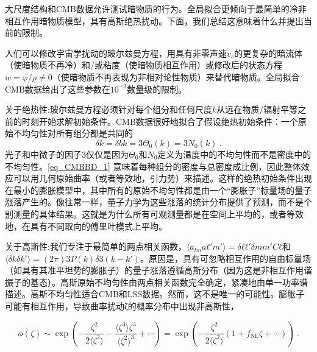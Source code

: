 
大尺度结构和CMB数据允许测试暗物质的行为。全局拟合更倾向于最简单的冷非相互作用暗物质模型，具有高斯绝热扰动。下面，我们总结这意味着什么并提出当前的限制。

人们可以修改宇宙学扰动的玻尔兹曼方程，用具有非零声速$v_s$的更复杂的暗流体（使暗物质不再冷）和/或粘度（使暗物质相互作用）或修改后的状态方程$w = \varphi/\rho \neq 0$（使暗物质不再表现为非相对论性物质）来替代暗物质。全局拟合CMB数据给出了这些参数在$10^{-3}$数量级的限制。

关于绝热性:玻尔兹曼方程必须针对每个组分和任何尺度$k$从远在物质/辐射平等之前的时刻开始求解初始条件。CMB数据很好地拟合了假设绝热初始条件：一个原始不均匀性对所有组分都是共同的
\begin{equation}\label{eq_CMBBD_1}
\delta k = \delta bk = 3\Theta_0(k) = 3N_0(k)~.
\end{equation}
光子和中微子的因子$3$仅仅是因为$\Theta_0$和$N_0$定义为温度中的不均匀性而不是密度中的不均匀性。\autoref{eq_CMBBD_1} 意味着每种组分的密度与总密度成比例，因此整体效应可以用几何原始曲率（或者等效地，引力势）来描述。这样的绝热初始条件出现在最小的膨胀模型中，其中所有的原始不均匀性都是由一个“膨胀子”标量场的量子涨落产生的。像往常一样，量子力学为这些涨落的统计分布提供了预测，而不是个别测量的具体结果。这就是为什么所有可观测量都是在空间上平均的，或者等效地，在具有不同取向的傅里叶模式上平均。

关于高斯性:我们专注于最简单的两点相关函数，$\langle a_{lm}aℓ′m′⟩ = δℓℓ′δmm′ Cℓ$和$⟨δkδk′⟩ = (2π)3 P(k) δ3(k − k′)$。原因是，具有可忽略相互作用的自由标量场（如具有其准平坦势的膨胀子）的量子涨落遵循高斯分布（因为这是非相互作用谐振子的基态）。高斯原始不均匀性由两点相关函数完全确定，紧凑地由单一功率谱描述。高斯不均匀性适合CMB和LSS数据。然而，这不是唯一的可能性。膨胀子可能有相互作用，导致曲率扰动ζ的概率分布中出现非高斯性，

\[ \phi(\zeta) \sim \exp \left( -\frac{\zeta^2}{2\langle\zeta^2\rangle} - \frac{\langle\zeta^3\rangle\zeta^3}{\langle\zeta^2\rangle^3} + \cdots \right) = \exp \left( -\frac{\zeta^2}{2\langle\zeta^2\rangle} (1 + f_{\text{NL}}\zeta + \cdots) \right) ~.\]

